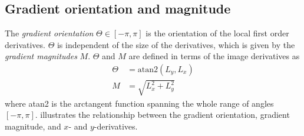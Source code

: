 \documentclass[thesis.tex]{subfiles}
\begin{document}
\subsection{Gradient orientation and magnitude}
\label{sec:gradientTheory}
%
The \emph{gradient orientation} $\Theta \in [-\pi,\pi]$ is the orientation of the local first order derivatives. $\Theta$ is independent of the size of the derivatives, which is given by the \emph{gradient magnitudes} $M$. $\Theta$ and $M$ are defined in terms of the image derivatives as
%
\begin{align*}
\Theta &= \text{atan2}(L_y,L_x) \\
M &= \sqrt{L_x^2 + L_y^2}
\end{align*}
where atan2 is the arctangent function spanning the whole range of angles $[-\pi,\pi]$.
%
 illustrates the relationship between the gradient orientation, gradient magnitude, and $x$- and $y$-derivatives.
%
\end{document}
